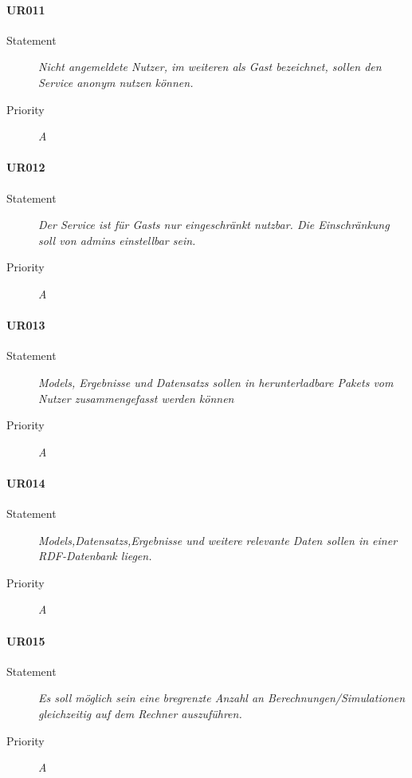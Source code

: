 \paragraph{UR011}
\begin{description}
\item[Statement] \textit{Nicht angemeldete Nutzer, im weiteren als \gls{Gast} bezeichnet, sollen den Service anonym nutzen können.}
\item[Priority] \textit{A}
\end{description}

\paragraph{UR012}
\begin{description}
\item[Statement] \textit{Der Service ist für \glspl{Gast} nur eingeschränkt nutzbar. Die Einschränkung soll von \glspl{admin} einstellbar sein.}
\item[Priority] \textit{A}
\end{description}

\paragraph{UR013}
\begin{description}
\item[Statement] \textit{\glspl{Model}, Ergebnisse und \glspl{Datensatz} sollen in  herunterladbare \glspl{Paket} vom Nutzer zusammengefasst werden können}%
\item[Priority] \textit{A}
\end{description}

\paragraph{UR014}
\begin{description}
\item[Statement] \textit{\glspl{Model},\glspl{Datensatz},Ergebnisse und weitere relevante Daten sollen in einer \gls{RDF}-Datenbank liegen.}%
\item[Priority] \textit{A}
\end{description}

\paragraph{UR015}
\begin{description}
\item[Statement] \textit{Es soll möglich sein eine bregrenzte Anzahl an Berechnungen/Simulationen gleichzeitig auf dem Rechner auszuführen.} %
\item[Priority] \textit{A}
\end{description}

